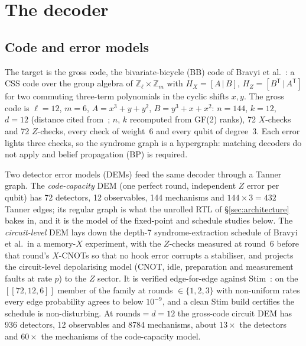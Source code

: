 \section{The decoder}
\label{sec:decoder}

\subsection*{Code and error models}

The target is the gross code, the \gross{} bivariate-bicycle (BB) code of
Bravyi et al.~\citep{bravyi2024gross}: a CSS code over the group algebra of
$\mathbb{Z}_\ell\times\mathbb{Z}_m$ with $H_X=[A\,|\,B]$,
$H_Z=[B^{\mathsf T}\,|\,A^{\mathsf T}]$ for two commuting three-term
polynomials in the cyclic shifts $x,y$.
The gross code is $\ell=12$, $m=6$, $A=x^3+y+y^2$, $B=y^3+x+x^2$: $n=144$,
$k=12$, $d=12$ (distance cited from~\citep{bravyi2024gross}; $n$, $k$
recomputed from GF(2) ranks), 72 $X$-checks and 72 $Z$-checks, every check of
weight~6 and every qubit of degree~3. Each error lights three checks, so the
syndrome graph is a hypergraph: matching decoders do not apply and belief
propagation (BP) is required.

Two detector error models (DEMs) feed the same decoder through a Tanner graph.
The \emph{code-capacity} DEM (one perfect round, independent $Z$ error per
qubit) has 72 detectors, 12 observables, 144 mechanisms and $144\times3=432$
Tanner edges; its regular graph is what the unrolled RTL of
\S\ref{sec:architecture} bakes in, and it is the model of the fixed-point and
schedule studies below.
The \emph{circuit-level} DEM lays down the depth-7 syndrome-extraction
schedule of Bravyi et al.\ in a memory-$X$ experiment, with the $Z$-checks
measured at round~6 before that round's $X$-CNOTs so that no hook error
corrupts a stabiliser, and projects the circuit-level depolarising model (CNOT,
idle, preparation and measurement faults at rate $p$) to the $Z$ sector.
It is verified edge-for-edge against Stim~\citep{gidney2021stim}: on the
$[[72,12,6]]$ member of the family at rounds $\in\{1,2,3\}$ with non-uniform
rates every edge probability agrees to below $10^{-9}$, and a clean Stim build
certifies the schedule is non-disturbing.
At $\mathrm{rounds}=d=12$ the gross-code circuit DEM has 936 detectors, 12
observables and 8784 mechanisms, about $13\times$ the detectors and $60\times$
the mechanisms of the code-capacity model.

